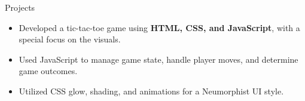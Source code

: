 \documentclass{resume} %
\begin{document}
\begin{workSection}{Projects}
         \customItem[
         title=\href{https://github.com/AshkanArabim/tic-tac-toe}{Tic Tac Toe Web App \faExternalLink},
         duration=Fall 2022,
         ]
         \begin{itemize}
             \vspace{-0.5em}
             \itemsep -6pt {}
             \item Developed a tic-tac-toe game using \textbf{HTML, CSS, and JavaScript}, with a special focus on the visuals.
             \item Used JavaScript to manage game state, handle player moves, and determine game outcomes.
             \item Utilized CSS glow{,} shading{,} and animations for a Neumorphist UI style.
         \end{itemize}


    

\end{workSection}
\end{document}
